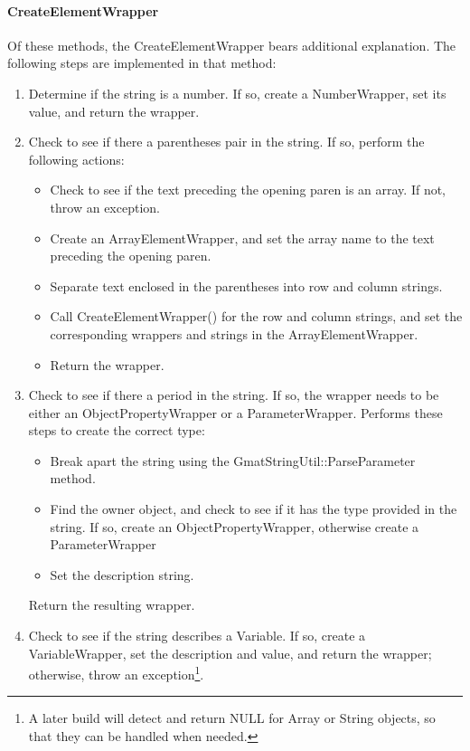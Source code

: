 \paragraph{CreateElementWrapper}  Of these methods, the CreateElementWrapper bears additional
explanation.  The following steps are implemented in that method:

\begin{enumerate}
\item Determine if the string is a number.  If so, create a NumberWrapper, set its value, and
return the wrapper.
\item Check to see if there a parentheses pair in the string.  If so, perform the following actions:
\begin{itemize}
\item Check to see if the text preceding the opening paren is an array.  If not, throw an exception.
\item Create an ArrayElementWrapper, and set the array name to the text preceding the opening paren.
\item Separate text enclosed in the parentheses into row and column strings.
\item Call CreateElementWrapper() for the row and column strings, and set the corresponding
wrappers and strings in the ArrayElementWrapper.
\item Return the wrapper.
\end{itemize}
\item Check to see if there a period in the string.  If so, the wrapper needs to be either an
ObjectPropertyWrapper or a ParameterWrapper.  Performs these steps to create the correct type:
\begin{itemize}
\item Break apart the string using the GmatStringUtil::ParseParameter method.
\item Find the owner object, and check to see if it has the type provided in the string.  If so,
create an ObjectPropertyWrapper, otherwise create a ParameterWrapper
\item Set the description string.
\end{itemize}
Return the resulting wrapper.
\item Check to see if the string describes a Variable.  If so, create a VariableWrapper, set the
description and value, and return the wrapper; otherwise, throw an exception\footnote{A later build
will detect and return NULL for Array or String objects, so that they can be handled when needed.}.
\end{enumerate}


